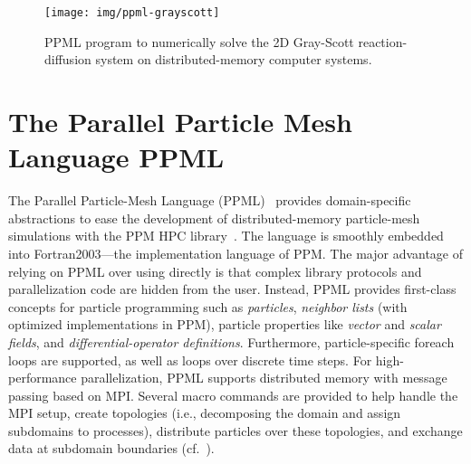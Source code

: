 \begin{figure}[t]
\texttt{[image: img/ppml-grayscott]}%
\label{fig:grayscott-ppml}%
\caption{PPML program to numerically solve the 2D Gray-Scott reaction-diffusion system on distributed-memory computer systems.}%
\end{figure}

\section{The Parallel Particle Mesh Language PPML}
\label{sec:ppml}
The Parallel Particle-Mesh Language (PPML)~\cite{Awile:2013,Awile:2013a} provides domain-specific abstractions to ease the development of distributed-memory 
particle-mesh simulations with the PPM HPC library~\cite{Sbalzarini2006a,Sbalzarini:2010,Awile:2010a}. The language is smoothly embedded into Fortran2003---the
implementation language of PPM. The major advantage of relying on PPML over using  directly is that complex library protocols and parallelization code are hidden from the user. Instead, PPML provides first-class concepts for particle programming such as \emph{particles},
\emph{neighbor lists} (with optimized implementations in PPM), particle properties like \emph{vector} and \emph{scalar fields}, and \emph{differential-operator
 definitions}. Furthermore, particle-specific foreach loops are supported, as well as loops over discrete time steps.
%
 For high-performance parallelization, PPML supports distributed memory with message passing based on MPI. Several macro commands
 are provided to help handle the MPI setup, create topologies (i.e., decomposing the domain and assign subdomains to processes), distribute particles
 over these topologies, and exchange data at subdomain boundaries (cf.~\cite{Sbalzarini2006a}).

